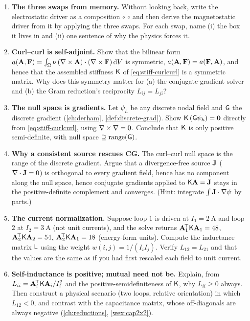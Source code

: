 \begin{enumerate}[label=\textbf{40.\arabic*}]

\item \textbf{The three swaps from memory.} Without looking back, write the
electrostatic driver as a composition  $\circ$ 
$\circ$  and then derive the magnetostatic driver from it by
applying the three swaps. For each swap, name (i) the box it lives in and (ii) one
sentence of why the physics forces it.

\item \textbf{Curl--curl is self-adjoint.} Show that the bilinear form
$a(\mathbf{A},\mathbf{F})=\int_\Omega\nu\,(\nabla\times\mathbf{A})\cdot(\nabla\times\mathbf{F})\,\mathrm{d}V$ is symmetric,
$a(\mathbf{A},\mathbf{F})=a(\mathbf{F},\mathbf{A})$, and hence that the assembled stiffness $\mathsf{K}$ of
\cref{eq:stiff-curlcurl} is a symmetric matrix. Why does this symmetry matter for
(a) the conjugate-gradient solver and (b) the Gram reduction's reciprocity
$L_{ij}=L_{ji}$?

\item \textbf{The null space is gradients.} Let $\psi_h$ be any discrete nodal field
and $\mathsf{G}$ the discrete gradient (\cref{ch:derham}, \cref{def:discrete-grad}).
Show $\mathsf{K}\,(\mathsf{G}\psi_h)=\mathbf 0$ directly from
\cref{eq:stiff-curlcurl}, using $\nabla\times\nabla=0$. Conclude that $\mathsf{K}$ is only
positive semi-definite, with null space $\supseteq\operatorname{range}(\mathsf{G})$.

\item \textbf{Why a consistent source rescues CG.} The curl--curl null space is the
range of the discrete gradient. Argue that a divergence-free source $\mathbf{J}$
($\nabla\cdot\mathbf{J}=0$) is orthogonal to every gradient field, hence has no component along
the null space, hence conjugate gradients applied to $\mathsf{K}\mathbf{A}=\mathbf{J}$ stays in the
positive-definite complement and converges. (Hint: integrate $\int\mathbf{J}\cdot\nabla\psi$
by parts.)

\item \textbf{The current normalization.} Suppose loop $1$ is driven at
$I_1=\SI{2}{\ampere}$ and loop $2$ at $I_2=\SI{3}{\ampere}$ (not unit currents), and
the solve returns $\mathbf{A}_1^{\!\top}\mathsf{K}\mathbf{A}_1=48$,
$\mathbf{A}_2^{\!\top}\mathsf{K}\mathbf{A}_2=54$, $\mathbf{A}_2^{\!\top}\mathsf{K}\mathbf{A}_1=18$ (energy-form units).
Compute the inductance matrix $\mathsf{L}$ using the weight $w(i,j)=1/(I_iI_j)$. Verify
$L_{12}=L_{21}$ and that the values are the same as if you had first rescaled each
field to unit current.

\item \textbf{Self-inductance is positive; mutual need not be.} Explain, from
$L_{ii}=\mathbf{A}_i^{\!\top}\mathsf{K}\mathbf{A}_i/I_i^2$ and the positive-semidefiniteness of
$\mathsf{K}$, why $L_{ii}\ge 0$ always. Then construct a physical scenario (two loops,
relative orientation) in which $L_{12}<0$, and contrast with the capacitance matrix,
whose off-diagonals are always negative (\cref{ch:reductions}, \cref{wex:cap2x2}).


\end{enumerate}
